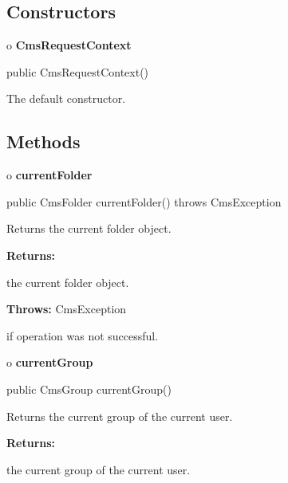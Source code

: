 \subsection*{  Constructors }

o {\bf CmsRequestContext} 

\begin{PRE}
 public CmsRequestContext()
\end{PRE}

\begin{description}
\htmlDD The default constructor. 

\end{description}

\subsection*{  Methods }

o {\bf currentFolder} 

\begin{PRE}
 public CmsFolder currentFolder() throws CmsException
\end{PRE}

\begin{description}
\htmlDD Returns the current folder object. 

\begin{description}
\item {\bf Returns:}  

the current folder object.  
\item {\bf Throws:} CmsException  

if operation was not successful.  
\end{description}

\end{description}

o {\bf currentGroup} 

\begin{PRE}
 public CmsGroup currentGroup()
\end{PRE}

\begin{description}
\htmlDD Returns the current group of the current user. 

\begin{description}
\item {\bf Returns:}  

the current group of the current user.  
\end{description}

\end{description}

